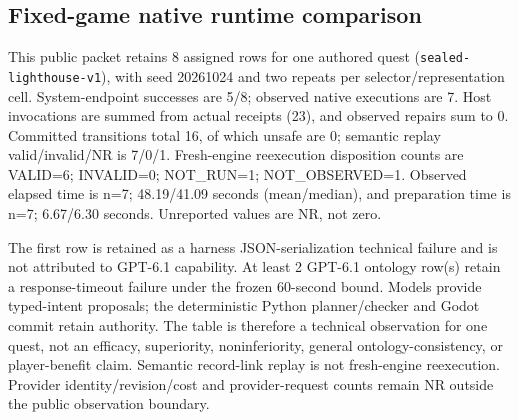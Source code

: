 \subsection{Fixed-game native runtime comparison}
This public packet retains 8 assigned rows for one authored quest (\texttt{sealed-lighthouse-v1}), with seed 20261024 and two repeats per selector/representation cell. System-endpoint successes are 5/8; observed native executions are 7. Host invocations are summed from actual receipts (23), and observed repairs sum to 0. Committed transitions total 16, of which unsafe are 0; semantic replay valid/invalid/NR is 7/0/1. Fresh-engine reexecution disposition counts are VALID=6; INVALID=0; NOT\_RUN=1; NOT\_OBSERVED=1. Observed elapsed time is n=7; 48.19/41.09 seconds (mean/median), and preparation time is n=7; 6.67/6.30 seconds. Unreported values are NR, not zero.

The first row is retained as a harness JSON-serialization technical failure and is not attributed to GPT-6.1 capability. At least 2 GPT-6.1 ontology row(s) retain a response-timeout failure under the frozen 60-second bound. Models provide typed-intent proposals; the deterministic Python planner/checker and Godot commit retain authority. The table is therefore a technical observation for one quest, not an efficacy, superiority, noninferiority, general ontology-consistency, or player-benefit claim. Semantic record-link replay is not fresh-engine reexecution. Provider identity/revision/cost and provider-request counts remain NR outside the public observation boundary.
